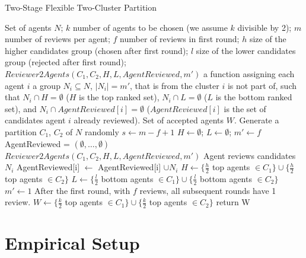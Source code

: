 \documentclass[letterpaper]{article}
\begin{document}
\begin{algorithm}[t]
\small
\caption{Two-Stage Flexible Two-Cluster Partition}\label{2StageFlexPartition}
\begin{algorithmic}[1]
\Require
Set of agents $N$; %
$k$ number of agents to be chosen (we assume $k$ divisible by 2);
\newline
$m$ number of reviews per agent;
\newline
$f$ number of reviews in first round;
\newline
$h$ size of the higher candidates group (chosen after first round);
\newline
$l$ size of the lower candidates group (rejected after first round);
\newline
$Reviewer2Agents(C_{1},C_{2},H,L,AgentReviewed,m')$ a function assigning each agent $i$ a group $N_{i}\subseteq N$, $|N_{i}|=m'$, that is from the cluster $i$ is not part of, such that $N_{i}\cap H=\emptyset$ ($H$ is the top ranked set), $N_{i}\cap L=\emptyset$ ($L$ is the bottom ranked set), and $N_{i}\cap AgentReviewed[i]=\emptyset$ ($AgentReviewed[i]$ is the set of candidates agent $i$ already reviewed).
\newline
\Ensure Set of accepted agents $W$.
\State Generate a partition {$C_{1}$, $C_{2}$} of $N$ randomly
\State $s \gets m - f + 1$ 
\State $H \gets \emptyset$; 
\State $L \gets \emptyset$; 
\State $m' \gets f$ 
\State AgentReviewed = $(\emptyset , \ldots , \emptyset)$
 \State $Reviewer2Agents(C_{1},C_{2},H,L,AgentReviewed,m')$
 \State Agent reviews candidates $N_{i}$ %
 \State AgentReviewed[i] $\gets$ AgentReviewed[i] $\cup N_{i}$
 \EndFor
 \State $H \gets \{ \frac{h}{2}$ top agents $\in C_{1} \} \cup \{ \frac{h}{2}$ top agents $\in C_{2} \}$
 \State $L \gets \{\frac{l}{2}$ bottom agents $\in C_{1} \} \cup \{ \frac{l}{2}$ bottom agents $\in C_{2} \}$
 \State $m' \gets1$ \Comment After the first round, with $f$ reviews, all subsequent rounds have 1 review.
\EndFor
\State $W \gets \{ \frac{k}{2}$ top agents $\in C_{1} \} \cup \{ \frac{k}{2}$ top agents $\in C_{2} \}$
\State return W
\end{algorithmic}
\end{algorithm}
\normalsize

\section{Empirical Setup}\label{setup}
\end{document}
